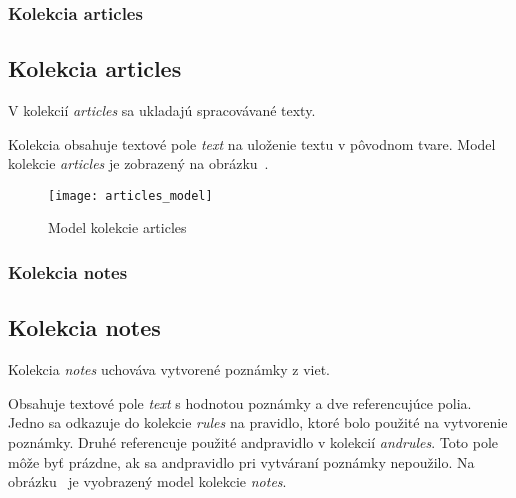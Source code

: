 %
%
{
	\subsubsection{Kolekcia articles}
}
{
	\subsection{Kolekcia articles}
}
\label{subsubsection:collection_articles}
V kolekcií \textit{articles} sa ukladajú spracovávané texty. 

Kolekcia obsahuje textové pole \textit{text} na uloženie textu v pôvodnom tvare. Model kolekcie \textit{articles} je zobrazený na obrázku~.

\begin{figure}[H]
	\begin{center}\texttt{[image: articles\_model]}\end{center}
	\caption[Model kolekcie articles]{Model kolekcie articles}\label{fig:articles_collection_model}
\end{figure}

%
%
{
	\subsubsection{Kolekcia notes}
}
{
	\subsection{Kolekcia notes}
}
\label{subsubsection:collection_notes}
Kolekcia \textit{notes} uchováva vytvorené poznámky z viet.

Obsahuje textové pole \textit{text} s hodnotou poznámky a dve referencujúce polia. Jedno sa odkazuje do kolekcie \textit{rules} na pravidlo, ktoré bolo použité na vytvorenie poznámky. Druhé referencuje použité and\hyph pravidlo v kolekcií \textit{and\textunderscore rules}. Toto pole môže byť prázdne, ak sa and\hyph pravidlo pri vytváraní poznámky nepoužilo. Na obrázku~ je vyobrazený model kolekcie \textit{notes}.

